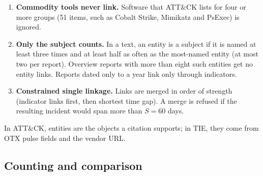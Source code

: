 \documentclass[runningheads]{llncs}
\newcommand{\attack}{ATT\&CK}
\begin{document}
\begin{enumerate}
\item \textbf{Commodity tools never link.} Software that \attack{} lists for four or more groups (51 items, such as Cobalt Strike, Mimikatz and PsExec) is ignored.
\item \textbf{Only the subject counts.} In a text, an entity is a subject if it is named at least three times and at least half as often as the most-named entity (at most two per report). Overview reports with more than eight such entities get no entity links. Reports dated only to a year link only through indicators.
\item \textbf{Constrained single linkage.} Links are merged in order of strength (indicator links first, then shortest time gap). A merge is refused if the resulting incident would span more than $S = 60$ days.
\end{enumerate}

In \attack{}, entities are the objects a citation supports; in TIE, they come from OTX pulse fields and the vendor URL.

\subsection{Counting and comparison}
\end{document}

